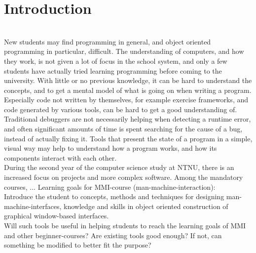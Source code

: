 \section{Introduction}\label{introduction}
~\\
New students may find programming in general, and object oriented programming in particular, difficult.
The understanding of computers, and how they work, is not given a lot of focus in the school system, and only a few students have actually tried learning programming before coming to the university.
With little or no previous knowledge, it can be hard to understand the concepts, and to get a mental model of what is going on when writing a program.
Especially code not written by themselves, for example exercise frameworks, and code generated by various tools, can be hard to get a good understanding of.
Traditional debuggers are not necessarily helping when detecting a runtime error, and often significant amounts of time is spent searching for the cause of a bug, instead of actually fixing it\cite{ko2006}.
Tools that present the state of a program in a simple, visual way may help to understand how a program works, and how its components interact with each other.
~\\

During the second year of the computer science study at NTNU, there is an increased focus on projects and more complex software.
Among the mandatory courses, ...
Learning goals for MMI-course (man-machine-interaction):\\
Introduce the student to concepts, methods and techniques for designing man-machine-interfaces, knowledge and skills in object oriented construction of graphical window-based interfaces.
~\\

Will such tools be useful in helping students to reach the learning goals of MMI and other beginner-courses?
Are existing tools good enough?
If not, can something be modified to better fit the purpose?